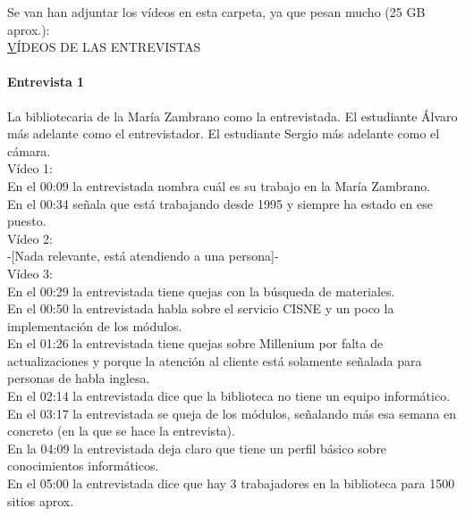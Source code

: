 \documentclass[12pt]{article}
\begin{document}
Se van han adjuntar los vídeos en esta carpeta, ya que pesan mucho (25 GB aprox.): \\ 
\href{https://drive.google.com/open?id=1xtkEMlOvB0MNnEpSeblKrLU2kJRvSYve}VÍDEOS DE LAS ENTREVISTAS\\

\paragraph{Entrevista 1} 

La bibliotecaria de la María Zambrano como la entrevistada. 
El estudiante Álvaro  más adelante como el entrevistador.
El estudiante Sergio más adelante como el cámara.\\
	
Vídeo 1: \\
En el 00:09 la entrevistada nombra cuál es su trabajo en la María Zambrano. \\
En el 00:34 señala que está trabajando desde 1995 y siempre ha estado en ese puesto.\\

Vídeo 2:\\
-[Nada relevante, está atendiendo a una persona]- \\

Vídeo 3:\\
En el 00:29 la entrevistada tiene quejas con la búsqueda de materiales. \\
En el 00:50 la entrevistada habla sobre el servicio CISNE y un poco la implementación de los módulos. \\
En el 01:26 la entrevistada tiene quejas sobre Millenium por falta de actualizaciones y porque la atención al cliente está solamente señalada para personas de habla inglesa.\\
En el 02:14 la entrevistada dice que la biblioteca no tiene un equipo informático.\\
En el 03:17 la entrevistada se queja de los módulos, señalando más esa semana en concreto (en la que se hace la entrevista).\\
En la 04:09 la entrevistada deja claro que tiene un perfil básico sobre conocimientos informáticos.\\
En el 05:00 la entrevistada dice que hay 3 trabajadores en la biblioteca para 1500 sitios aprox.\\
\end{document}
